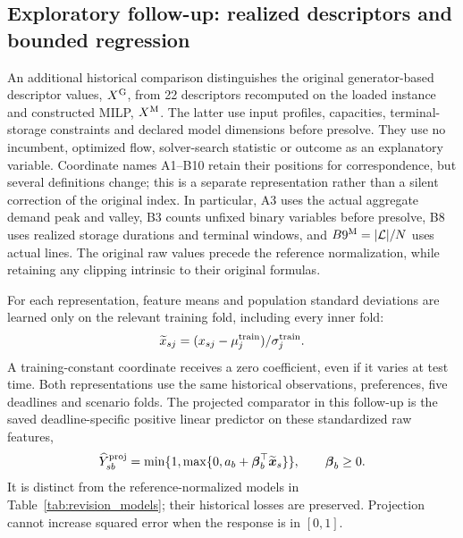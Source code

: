 \subsection{Exploratory follow-up: realized descriptors and bounded regression}
\label{sec:bounded_method}
An additional historical comparison distinguishes the original generator-based
descriptor values, $X^{\rm G}$, from 22 descriptors recomputed on the loaded
instance and constructed MILP, $X^{\rm M}$. The latter use input profiles,
capacities, terminal-storage constraints and declared model dimensions before
presolve. They use no incumbent, optimized flow, solver-search statistic or
outcome as an explanatory variable. Coordinate names A1--B10 retain their
positions for correspondence, but several definitions change; this is a
separate representation rather than a silent correction of the original index.
In particular, A3 uses the actual aggregate demand peak and valley, B3 counts
unfixed binary variables before presolve, B8 uses realized storage durations
and terminal windows, and $B9^{\rm M}=|\mathcal L|/N$ uses actual lines.
The original raw values precede the reference normalization, while retaining
any clipping intrinsic to their original formulas.

For each representation, feature means and population standard deviations
are learned only on the relevant training fold, including every inner fold:
\begin{equation}
 \widetilde x_{sj}=(x_{sj}-\mu_j^{\rm train})/\sigma_j^{\rm train}.
\end{equation}
A training-constant coordinate receives a zero coefficient, even if it varies
at test time. Both representations use the same historical observations,
preferences, five deadlines and scenario folds. The projected comparator in
this follow-up is the saved deadline-specific positive linear predictor on
these standardized raw features,
\begin{equation}
 \widehat Y^{\rm proj}_{sb}=\min\{1,\max\{0,a_b+\boldsymbol\beta_b^\top
 \widetilde{\boldsymbol x}_s\}\},\qquad\boldsymbol\beta_b\geq0.
 \label{eq:followup_projection}
\end{equation}
It is distinct from the reference-normalized models in
Table~\ref{tab:revision_models}; their historical losses are preserved.
Projection cannot increase squared error when the response is in $[0,1]$.

